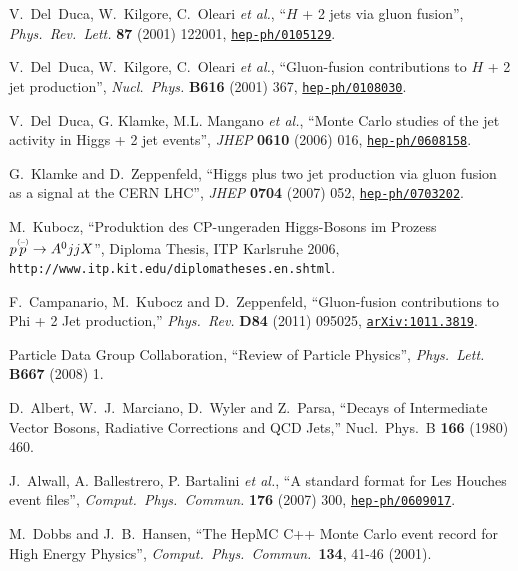 \documentclass[english,12pt]{article}
\begin{document}
\begin{thebibliography}{10}
V.~Del~Duca, W.~Kilgore, C.~Oleari {\it et al.}, ``{$H$ + 2
  jets via gluon fusion}'', {\em Phys.\ Rev.\ Lett.} {\bf 87} (2001) 122001,
\href{http://www.arXiv.org/abs/hep-ph/0105129}{{\tt hep-ph/0105129}}.

V.~Del~Duca, W.~Kilgore, C.~Oleari {\it et al.},
  ``{Gluon-fusion contributions to $H$ + 2 jet production}'', {\em Nucl.\ Phys.}
  {\bf B616} (2001) 367,
\href{http://www.arXiv.org/abs/hep-ph/0108030}{{\tt hep-ph/0108030}}.

V.~Del~Duca, G. Klamke, M.L. Mangano {\it et al.}, ``{Monte Carlo studies of the jet activity in Higgs +
  2 jet events}'', {\em JHEP} {\bf 0610} (2006) 016,
\href{http://www.arXiv.org/abs/hep-ph/0608158}{{\tt hep-ph/0608158}}.

G.~Klamke and D.~Zeppenfeld, ``{Higgs plus two jet production via gluon fusion
  as a signal at the CERN LHC}'', {\em JHEP} {\bf 0704} (2007) 052,
\href{http://www.arXiv.org/abs/hep-ph/0703202}{{\tt hep-ph/0703202}}.

M.~Kubocz, ``Produktion des CP-ungeraden Higgs-Bosons im Prozess $p \overset{\mbox{\tiny{(--)}}}{p} \to
  A^{0}jjX$'', {Diploma Thesis, ITP Karlsruhe 2006}, {{\tt http://www.itp.kit.edu/diplomatheses.en.shtml}}.

  F.~Campanario, M.~Kubocz and D.~Zeppenfeld,
  ``Gluon-fusion contributions to Phi + 2 Jet production,''
  {\em Phys.\ Rev.} {\bf D84} (2011) 095025,
  \href{http://www.arXiv.org/abs/1011.3819}{{\tt arXiv:1011.3819}}.

{Particle Data Group} Collaboration, ``{Review of
  Particle Physics}'', {\em Phys.\ Lett.} {\bf B667} (2008) 1.

  D.~Albert, W.~J.~Marciano, D.~Wyler and Z.~Parsa,
  ``Decays of Intermediate Vector Bosons, Radiative Corrections and QCD Jets,''
  Nucl.\ Phys.\ B {\bf 166} (1980) 460.

J.~Alwall, A. Ballestrero, P. Bartalini {\em et al.}, ``A standard format for Les Houches event files'', {\em
  Comput.\ Phys.\ Commun.} {\bf 176} (2007) 300,
\href{http://www.arXiv.org/abs/hep-ph/0609017}{{\tt hep-ph/0609017}}.

  M.~Dobbs and J.~B.~Hansen,
  ``The HepMC C++ Monte Carlo event record for High Energy Physics'',
  {\em Comput.\ Phys.\ Commun.\  }{\bf 134}, 41-46 (2001).


\end{thebibliography}
\end{document}
